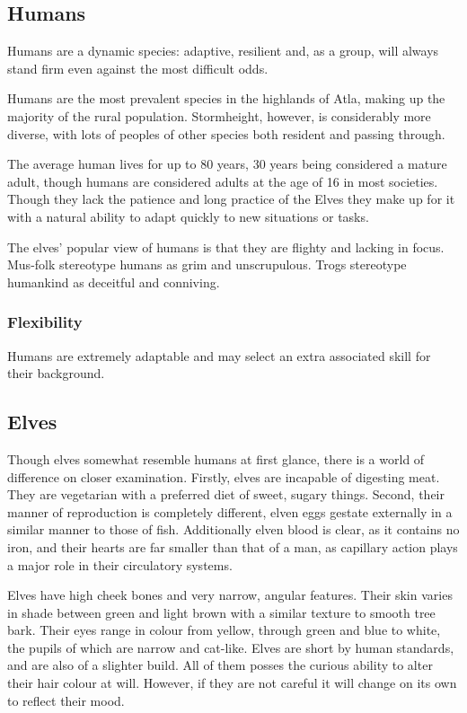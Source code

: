 \documentclass[a4paper,11pt,oneside]{book}
\begin{document}
\subsection{Humans}
Humans are a dynamic species: adaptive, resilient and, as a group, will always stand firm even against the most difficult odds.

Humans are the most prevalent species in the highlands of Atla, making up the majority of the rural population. Stormheight, however, is considerably more diverse, with lots of peoples of other species both resident and passing through.

The average human lives for up to 80 years, 30 years being considered a mature adult, though humans are considered adults at the age of 16 in most societies. Though they lack the patience and long practice of the Elves they make up for it with a natural ability to adapt quickly to new situations or tasks. 

The elves' popular view of humans is that they are flighty and lacking in focus. Mus-folk stereotype humans as grim and unscrupulous. Trogs stereotype humankind as deceitful and conniving.  

\subsubsection*{Flexibility}
Humans are extremely adaptable and may select an extra associated skill for their background.


\subsection{Elves}
Though elves somewhat resemble humans at first glance, there is a world of difference on closer examination. Firstly, elves are incapable of digesting meat. They are vegetarian with a preferred diet of sweet, sugary things. Second, their manner of reproduction is completely different, elven eggs gestate externally in a similar manner to those of fish. Additionally elven blood is clear, as it contains no iron, and their hearts are far smaller than that of a man, as capillary action plays a major role in their circulatory systems.

Elves have high cheek bones and very narrow, angular features. Their skin varies in shade between green and light brown with a similar texture to smooth tree bark. Their eyes range in colour from yellow, through green and blue to white, the pupils of which are narrow and cat-like. Elves are short by human standards, and are also of a slighter build. All of them posses the curious ability to alter their hair colour at will. However, if they are not careful it will change on its own to reflect their mood. 
\end{document}
